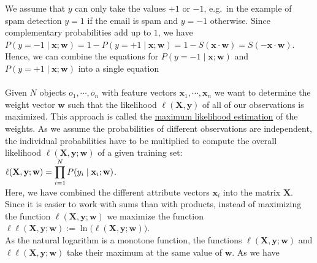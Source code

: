 We assume that $y$ can only take the values $+1$ or $-1$,  e.g.~in the example of spam detection $y = 1$ if the
email is spam and $y = -1$ otherwise.  Since complementary probabilities add up to $1$, we have
\\[0.2cm]
\hspace*{1.3cm}
$P(y=-1\;|\;\mathbf{x};\mathbf{w}) = 1 - P(y=+1\;|\;\mathbf{x};\mathbf{w}) 
  = 1 - S(\mathbf{x} \cdot \mathbf{w}) = S(-\mathbf{x} \cdot \mathbf{w})
$.
\\[0.2cm]
Hence, we can combine the equations for $P(y=-1\;|\;\mathbf{x};\mathbf{w})$ and $P(y=+1\;|\;\mathbf{x};\mathbf{w})$ into a
single equation
\\[0.2cm]
\hspace*{1.3cm}
\colorbox{red}{}
\\[0.2cm]
Given $N$ objects $o_1, \cdots, o_n $ with feature vectors $\mathbf{x}_1, \cdots, \mathbf{x}_n$ we
want to determine the weight vector $\mathbf{w}$ such that the likelihood $\ell(\mathbf{X}, \mathbf{y})$ of all of our
observations is maximized.  This approach is called the 
\href{https://en.wikipedia.org/wiki/Maximum_likelihood_estimation}{maximum likelihood estimation} of the weights.
As we assume the probabilities of different observations are independent, the individual
probabilities have to be multiplied to compute the overall likelihood $\ell(\mathbf{X}, \mathbf{y};\mathbf{w})$ 
of a given training set:
\\[0.2cm]
\hspace*{1.3cm}
$\displaystyle \ell(\mathbf{X},\mathbf{y};\mathbf{w}) = \prod\limits_{i=1}^N P(y_i \;|\;\mathbf{x}_i;\mathbf{w})$.
\\[0.2cm]
Here, we have combined the different attribute vectors $\mathbf{x}_i$ into the matrix $\mathbf{X}$.  Since it is
easier to work with sums than with products, instead of maximizing the function $\ell(\mathbf{X},\mathbf{y};\mathbf{w})$ we maximize the function
\\[0.2cm]
\hspace*{1.3cm}
$\ell\ell(\mathbf{X},\mathbf{y};\mathbf{w}) := \ln\bigl(\ell(\mathbf{X},\mathbf{y};\mathbf{w})\bigr)$. 
\\[0.2cm]
As the natural logarithm is a monotone function, the functions $\ell(\mathbf{X},\mathbf{y};\mathbf{w})$ and 
$\ell\ell(\mathbf{X},\mathbf{y};\mathbf{w})$ take their maximum at the same value of $\mathbf{w}$.  As we have
\\[0.2cm]
